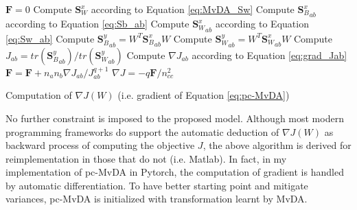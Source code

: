         \begin{algorithm}
            \SetEndCharOfAlgoLine{\relax}
            $\boldsymbol{F} = 0$\;
            Compute $\boldsymbol{S}_W^x$ according to Equation \eqref{eq:MvDA_Sw}\;
             {
                 {
                    Compute ${\boldsymbol{S}_B^x}_{ab}$ according to Equation \eqref{eq:Sb_ab}\;
                    Compute ${\boldsymbol{S}_W^x}_{ab}$ according to Equation \eqref{eq:Sw_ab}\;
                    Compute ${\boldsymbol{S}_B^y}_{ab}=W^T{\boldsymbol{S}_B^x}_{ab}W$\;
                    Compute ${\boldsymbol{S}_W^y}_{ab}=W^T{\boldsymbol{S}_W^x}_{ab}W$\;
                    Compute $J_{ab}=tr\left({\boldsymbol{S}_B^y}_{ab}\right)/tr\left({\boldsymbol{S}_W^y}_{ab}\right)$\;
                    Compute $\nabla J_{ab}$ according to Equation \eqref{eq:grad_Jab}\;
                    $\boldsymbol{F} = \boldsymbol{F} + n_an_b\nabla J_{ab}/J_{ab}^{q+1}$\;
                }
            }
            $\nabla J = {-q\boldsymbol{F}}/{n_{cc}^2}$\;
            \caption{Computation of $\nabla J\left(W\right)$ (i.e. gradient of Equation \eqref{eq:pc-MvDA})}
            \label{algo:grad_computation}
        \end{algorithm}

        No further constraint is imposed to the proposed model. Although most modern programming frameworks do support the automatic deduction of $\nabla J\left(W\right)$ as backward process of computing the objective $J$, the above algorithm is derived for reimplementation in those that do not (i.e. Matlab).
        In fact, in my implementation of pc-MvDA in Pytorch, the computation of gradient is handled by automatic differentiation.
        To have better starting point and mitigate variances, pc-MvDA is initialized with transformation learnt by MvDA.
